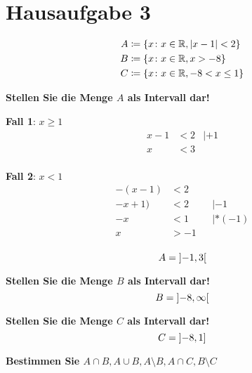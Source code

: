 \documentclass{article}
\begin{document}
\section*{Hausaufgabe 3}

\begin{align*}
  A &\coloneqq \{ x \colon x \in \mathbb{R}, \abs{x - 1} < 2 \} \\
  B &\coloneqq \{ x \colon x \in \mathbb{R}, x > -8 \} \\
  C &\coloneqq \{ x \colon x \in \mathbb{R}, -8 <x \leq 1 \} \\
\end{align*}

\textbf{Stellen Sie die Menge $A$ als Intervall dar!} \\

\begin{minipage}[t]{.45\textwidth}
  \textbf{Fall 1}: $x \geq 1$ \\
  \begin{align*}
    x - 1 &< 2 & | +1\\
    x &< 3 \\
  \end{align*}
\end{minipage}
\hfill
\vrule
\hfill
\begin{minipage}[t]{.45\textwidth}
  \textbf{Fall 2}: $x < 1$ \\
  \begin{align*}
    -(x - 1) &< 2 \\
    -x + 1) &< 2 &&| -1 \\
    -x &< 1 &&| * (-1) \\
    x &> -1 \\
  \end{align*}
\end{minipage}

\[
  A = \interval[open]{-1}{3}
\]

\textbf{Stellen Sie die Menge $B$ als Intervall dar!} \\

\[
  B = \interval[open]{-8}{\infty}
\]

\textbf{Stellen Sie die Menge $C$ als Intervall dar!} \\

\[
  C = \interval[open left]{-8}{1}
\]

\textbf{Bestimmen Sie $A \cap B, A \cup B, A \setminus B, A \cap C, B \setminus C$}
\end{document}

